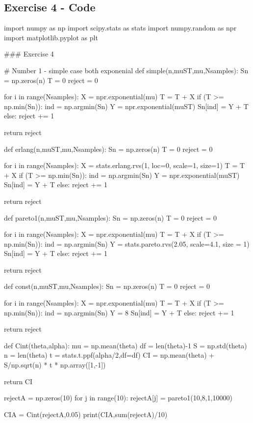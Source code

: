\subsection*{Exercise 4 - Code}
\begin{python}
import numpy as np
import scipy.stats as stats
import numpy.random as npr
import matplotlib.pyplot as plt


### Exercise 4

# Number 1 - simple case both exponenial
def simple(n,muST,mu,Nsamples):
    Sn = np.zeros(n)
    T = 0
    reject = 0

    for i in range(Nsamples):
        X = npr.exponential(mu)
        T = T + X
        if (T >= np.min(Sn)):
            ind = np.argmin(Sn)
            Y = npr.exponential(muST)
            Sn[ind] = Y + T
        else:
            reject += 1

    return reject

def erlang(n,muST,mu,Nsamples):
    Sn = np.zeros(n)
    T = 0
    reject = 0

    for i in range(Nsamples):
        X = stats.erlang.rvs(1, loc=0, scale=1, size=1)
        T = T + X
        if (T >= np.min(Sn)):
            ind = np.argmin(Sn)
            Y = npr.exponential(muST)
            Sn[ind] = Y + T
        else:
            reject += 1

    return reject

def pareto1(n,muST,mu,Nsamples):
    Sn = np.zeros(n)
    T = 0
    reject = 0

    for i in range(Nsamples):
        X = npr.exponential(mu)
        T = T + X
        if (T >= np.min(Sn)):
            ind = np.argmin(Sn)
            Y = stats.pareto.rvs(2.05, scale=4.1, size = 1)
            Sn[ind] = Y + T
        else:
            reject += 1

    return reject

def const(n,muST,mu,Nsamples):
    Sn = np.zeros(n)
    T = 0
    reject = 0

    for i in range(Nsamples):
        X = npr.exponential(mu)
        T = T + X
        if (T >= np.min(Sn)):
            ind = np.argmin(Sn)
            Y =  8
            Sn[ind] = Y + T
        else:
            reject += 1

    return reject


def Cint(theta,alpha):
    mu = np.mean(theta)
    df = len(theta)-1
    S = np.std(theta)
    n = len(theta)
    t = stats.t.ppf(alpha/2,df=df)
    CI = np.mean(theta) + S/np.sqrt(n) * t * np.array([1,-1])

    return CI


rejectA = np.zeros(10)
for j in range(10):
    rejectA[j] = pareto1(10,8,1,10000)

CIA = Cint(rejectA,0.05)
print(CIA,sum(rejectA)/10)




\end{python}

